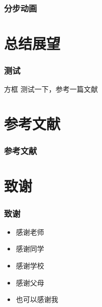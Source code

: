 \documentclass[14pt, AutoFakeBold]{ldr}
\begin{document}
\begin{frame}
  \frametitle{分步动画}




\end{frame}

\section{总结展望}

\begin{frame}
  \frametitle{测试}

  \begin{block}{方框}
    测试一下，参考一篇文献\cite{partl2016}
  \end{block}

\end{frame}


\section{参考文献}
\begin{frame}[t]
  \frametitle{参考文献}
  
  
  
\end{frame}

\section{致谢}

\begin{frame}[t]
\frametitle{致谢}
  \begin{itemize}
  \item 感谢老师
  \item 感谢同学
  \item 感谢学校
  \item 感谢父母
  \item 也可以感谢我 ~
  \end{itemize}
\end{frame}
\end{document}
